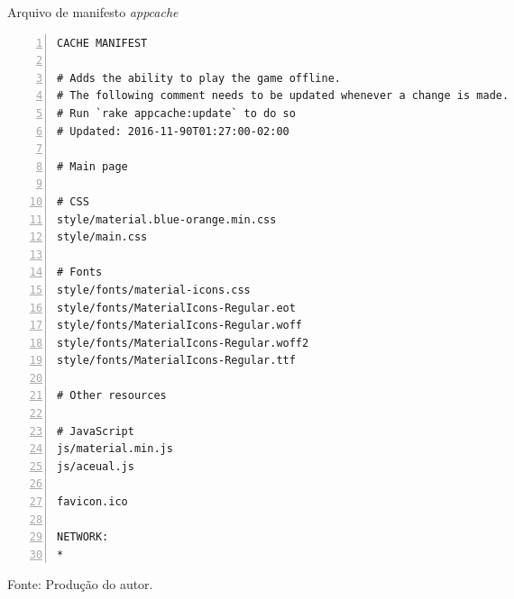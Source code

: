 \begin{quadro}[h]
\centering
  \caption{Arquivo de manifesto \textit{appcache}}\label{qua:cache-appcache}
\begin{lstlisting}[numbers=left,frame=single]
CACHE MANIFEST

# Adds the ability to play the game offline.
# The following comment needs to be updated whenever a change is made.
# Run `rake appcache:update` to do so
# Updated: 2016-11-90T01:27:00-02:00

# Main page

# CSS
style/material.blue-orange.min.css
style/main.css

# Fonts
style/fonts/material-icons.css
style/fonts/MaterialIcons-Regular.eot
style/fonts/MaterialIcons-Regular.woff
style/fonts/MaterialIcons-Regular.woff2
style/fonts/MaterialIcons-Regular.ttf

# Other resources

# JavaScript
js/material.min.js
js/aceual.js

favicon.ico

NETWORK:
*

\end{lstlisting}
  \caption*{\ifdraft{\color{green}}{}\footnotesize Fonte: Produção do autor.}
\end{quadro}

\ifdraft{}{

%
%
%
%
%
%
%
%
%
}
